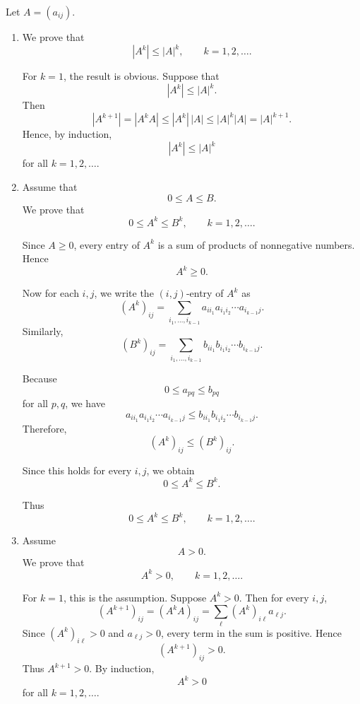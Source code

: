 \documentclass{ctexart}
\begin{document}
\begin{solution}
  Let \(A=(a_{ij})\).

  \begin{enumerate}
    \item[(a)]
      We prove that
      \[
        |A^k|\le |A|^k,\qquad k=1,2,\ldots .
      \]

      For \(k=1\), the result is obvious. Suppose that
      \[
        |A^k|\le |A|^k.
      \]
      Then
      \[
        |A^{k+1}|
        =|A^kA|
        \le |A^k|\,|A|
        \le |A|^k|A|
        =|A|^{k+1}.
      \]
      Hence, by induction,
      \[
        |A^k|\le |A|^k
      \]
      for all \(k=1,2,\ldots\).
    \item[(b)]
      Assume that
      \[
        0\le A\le B.
      \]
      We prove that
      \[
        0\le A^k\le B^k,\qquad k=1,2,\ldots .
      \]

      Since \(A\ge0\), every entry of \(A^k\) is a sum of products of
      nonnegative numbers. Hence
      \[
        A^k\ge0.
      \]

      Now for each \(i,j\), we write the \((i,j)\)-entry of \(A^k\) as
      \[
        (A^k)_{ij}
        =
        \sum_{i_1,\ldots,i_{k-1}}
        a_{i i_1}a_{i_1 i_2}\cdots a_{i_{k-1}j}.
      \]
      Similarly,
      \[
        (B^k)_{ij}
        =
        \sum_{i_1,\ldots,i_{k-1}}
        b_{i i_1}b_{i_1 i_2}\cdots b_{i_{k-1}j}.
      \]

      Because
      \[
        0\le a_{pq}\le b_{pq}
      \]
      for all \(p,q\), we have
      \[
        a_{i i_1}a_{i_1 i_2}\cdots a_{i_{k-1}j}
        \le
        b_{i i_1}b_{i_1 i_2}\cdots b_{i_{k-1}j}.
      \]
      Therefore,
      \[
        (A^k)_{ij}\le (B^k)_{ij}.
      \]

      Since this holds for every \(i,j\), we obtain
      \[
        0\le A^k\le B^k.
      \]

      Thus
      \[
        0\le A^k\le B^k,\qquad k=1,2,\ldots .
      \]

    \item[(c)]
      Assume
      \[
        A>0.
      \]
      We prove that
      \[
        A^k>0,\qquad k=1,2,\ldots .
      \]

      For \(k=1\), this is the assumption. Suppose \(A^k>0\). Then for every \(i,j\),
      \[
        (A^{k+1})_{ij}
        =(A^kA)_{ij}
        =\sum_{\ell}(A^k)_{i\ell}a_{\ell j}.
      \]
      Since \((A^k)_{i\ell}>0\) and \(a_{\ell j}>0\), every term in the sum is positive. Hence
      \[
        (A^{k+1})_{ij}>0.
      \]
      Thus \(A^{k+1}>0\). By induction,
      \[
        A^k>0
      \]
      for all \(k=1,2,\ldots\).


\end{enumerate}
\end{solution}
\end{document}
